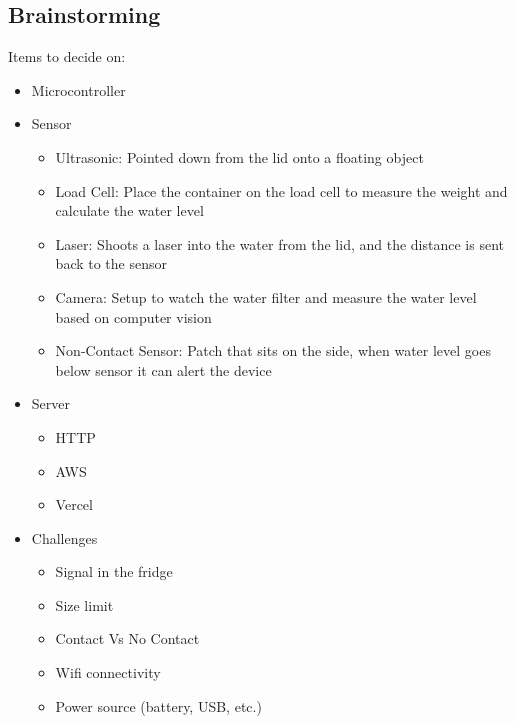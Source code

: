 \subsection{Brainstorming}

Items to decide on:
\begin{itemize}
    \item Microcontroller
   \item Sensor
    \begin{itemize}
        \item Ultrasonic: Pointed down from the lid onto a floating object
        \item Load Cell: Place the container on the load cell to measure the weight and calculate the water level
        \item Laser: Shoots a laser into the water from the lid, and the distance is sent back to the sensor
        \item Camera: Setup to watch the water filter and measure the water level based on computer vision
        \item Non-Contact Sensor: Patch that sits on the side, when water level goes below sensor it can alert the device
    \end{itemize}
    
    \item Server
    \begin{itemize}
        \item HTTP
        \item AWS
        \item Vercel
    \end{itemize}
    
    \item Challenges
    \begin{itemize}
        \item Signal in the fridge
        \item Size limit
        \item Contact Vs No Contact
        \item Wifi connectivity
        \item Power source (battery, USB, etc.)
    \end{itemize}
\end{itemize}
